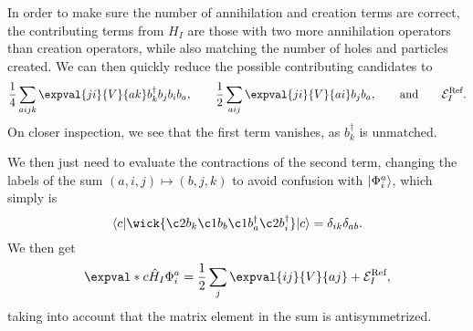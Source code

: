 \begin{comment}
    Considering the one-body part, we have
    \begin{align*}
        \expval{c}{\hat{H}_0}{\Phi_i^a} &= \sum_{\alpha\beta} \expval{\alpha}{\hat{h}_0}{\beta} \expval{c}{a_\alpha^\dagger a_\beta}{\Phi_i^a} \\
        &= \sum_{\alpha\beta} \expval{\alpha}{\hat{h}_0}{\beta} \expval{c}{a_\alpha^\dagger a_\beta a_a^\dagger a_i}{c}. \\
    \end{align*}
    The only possible contraction is
    \begin{equation*}
        \langle
        \wick{
            c
            \vert
            \c2 a_\alpha^\dagger \c1 a_\beta \c1 a_a^\dagger \c2 a_i
            \vert
            c
        }
        \rangle,
    \end{equation*}
    such that $\alpha = i$ and $\beta = a$.
    The expectation value of the one-body part is then
    \begin{equation*}
        \expval{c}{\hat{H}_0}{\Phi_i^a} = \sum_{\alpha \beta} \expval{\alpha}{\hat{h}_0}{\beta} \delta_{\alpha i} \delta_{\beta a} = \expval{i}{\hat{h}_0}{a} = 0,
    \end{equation*}
    which vanishes due to the $\delta_{ij}$ term of Eq.~\eqref{eq:onebody}.
\end{comment}

In order to make sure the number of annihilation and creation terms are correct, the contributing terms from $H_I$ are those with two more annihilation operators than creation operators, while also matching the number of holes and particles created.
We can then quickly reduce the possible contributing candidates to
\begin{equation*}
    \frac{1}{4} \sum_{aijk} \expval{ji}{V}{ak} b_k^\dagger b_j b_i b_a, \qquad
    \frac{1}{2} \sum_{aij} \expval{ji}{V}{ai} b_j b_a, \qquad
    \text{and} \qquad \mathcal{E}_I^\text{Ref}.
\end{equation*}
On closer inspection, we see that the first term vanishes, as $b_k^\dagger$ is unmatched.

We then just need to evaluate the contractions of the second term, changing the labels of the sum $(a, i, j) \mapsto (b, j, k)$ to avoid confusion with $\lvert\Phi_i^a\rangle$, which simply is
\begin{equation*}
    \langle c \vert
    \wick{
        \c2 b_k \c1 b_b \c1 b_a^\dagger \c2 b_i^\dagger
    }
    \vert c \rangle
    = \delta_{ik} \delta_{ab}.
\end{equation*}
We then get
\begin{equation}\label{eq:1p1h-ground-twobody}
    \expval*{c}{\hat{H}_I}{\Phi_i^a} = \frac{1}{2} \sum_{j} \expval{i j}{V}{a j} + \mathcal{E}_I^{\text{Ref}},
\end{equation}
taking into account that the matrix element in the sum is antisymmetrized.

